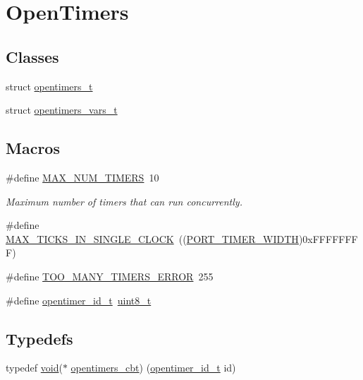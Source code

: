 \hypertarget{group___open_timers}{}\section{Open\+Timers}
\label{group___open_timers}
\subsection*{Classes}
\begin{DoxyCompactItemize}
\item 
struct \hyperlink{structopentimers__t}{opentimers\+\_\+t}
\item 
struct \hyperlink{structopentimers__vars__t}{opentimers\+\_\+vars\+\_\+t}
\end{DoxyCompactItemize}
\subsection*{Macros}
\begin{DoxyCompactItemize}
\item 
\#define \hyperlink{group___open_timers_gaacf8ae36c6e504e7361613a7d9a85d69}{M\+A\+X\+\_\+\+N\+U\+M\+\_\+\+T\+I\+M\+E\+RS}~10
\begin{DoxyCompactList}\small\item\em Maximum number of timers that can run concurrently. \end{DoxyCompactList}\item 
\#define \hyperlink{group___open_timers_ga9561941a53acd6abd5d0501eddefc2ad}{M\+A\+X\+\_\+\+T\+I\+C\+K\+S\+\_\+\+I\+N\+\_\+\+S\+I\+N\+G\+L\+E\+\_\+\+C\+L\+O\+CK}~((\hyperlink{z1_2board__info_8h_abe66b9c1c60db84f2a99f2b827275f24}{P\+O\+R\+T\+\_\+\+T\+I\+M\+E\+R\+\_\+\+W\+I\+D\+TH})0x\+F\+F\+F\+F\+F\+F\+F\+F)
\item 
\#define \hyperlink{group___open_timers_ga8093989c737905bbf51a411475ef88e7}{T\+O\+O\+\_\+\+M\+A\+N\+Y\+\_\+\+T\+I\+M\+E\+R\+S\+\_\+\+E\+R\+R\+OR}~255
\item 
\#define \hyperlink{group___open_timers_gae5ca9e65d270cdfa4bc74008d96d69ab}{opentimer\+\_\+id\+\_\+t}~\hyperlink{_p_e___types_8h_aba7bc1797add20fe3efdf37ced1182c5}{uint8\+\_\+t}
\end{DoxyCompactItemize}
\subsection*{Typedefs}
\begin{DoxyCompactItemize}
\item 
typedef \hyperlink{usb__devapi_8h_afabf60e7f57651d6d595a02c75f07cd0}{void}($\ast$ \hyperlink{group___open_timers_ga93a6f1f7e03cd8ad88cbd9509db173cf}{opentimers\+\_\+cbt}) (\hyperlink{group___open_timers_gae5ca9e65d270cdfa4bc74008d96d69ab}{opentimer\+\_\+id\+\_\+t} id)
\end{DoxyCompactItemize}
